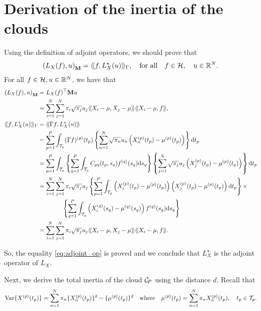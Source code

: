 \section{Derivation of the inertia of the clouds} %
\label{sec:derivation_of_the_inertia_of_the_clouds}

Using the definition of adjoint operators, we should prove that
\begin{equation}\label{eq:adjoint_op}
    \left(L_X(f), u\right)_{\mathbf{M}} = \langle\!\langle f, L^\star_X(u)\rangle\!\rangle_\Gamma, \quad\text{for all}\quad f \in \mathcal{H},\quad u \in \mathbb{R}^N.
\end{equation}
For all $f \in \mathcal{H}, u \in \mathbb{R}^N$, we have that
\begin{align*}
    \inRM{L_X(f)}{u} &= L_X(f)^\top \mathbf{M} u \\
    &= \sum_{i = 1}^N\sum_{j = 1}^N \pi_i \sqrt{\pi_j} u_j \inH{X_i - \mu}{X_j - \mu}\inH{X_i - \mu}{f}, \\
    \inHG{f}{L^\star_X(u)} &= \inH{\Gamma f}{L^\star_X(u)} \\
    &= \sum_{p = 1}^P \int_{\TT{p}} (\Gamma f)^{(p)}(t_p) \left\{ \sum_{n = 1}^N \sqrt{\pi_n} u_n \left(\Xnp(t_p) - \mup{p}(t_p)\right) \right\} \dd t_p \\
    &= \sum_{p = 1}^P \int_{\TT{p}} \left\{\sum_{q = 1}^P \int_{\TT{q}} C_{pq}(t_p, s_q)f^{(q)}(s_q) \dd s_q\right\} \left\{ \sum_{j = 1}^N \sqrt{\pi_j} u_j \left(X_j^{(p)}(t_p) - \mup{p}(t_p)\right) \right\} \dd t_p \\
    &= \sum_{i = 1}^N \sum_{j = 1}^N \pi_i \sqrt{\pi_j} u_j \left\{\sum_{p = 1}^P \int_{\TT{p}} \left(X_i^{(p)}(t_p) - \mup{p}(t_p)\right)\left(X_j^{(p)}(t_p) - \mup{p}(t_p)\right)\dd t_p\right\} \times \\
    &\qquad\qquad \left\{\sum_{q = 1}^P \int_{\TT{q}} \left(X_i^{(q)}(s_q) - \mup{q}(s_q)\right)f^{(q)}(s_q)\dd s_q\right\} \\
    &= \sum_{i = 1}^N\sum_{j = 1}^N \pi_i \sqrt{\pi_j} u_j \inH{X_i - \mu}{X_j - \mu}\inH{X_i - \mu}{f}.
\end{align*}

So, the equality \eqref{eq:adjoint_op} is proved and we conclude that $L^\star_X$ is the adjoint operator of $L_X$.

Next, we derive the total inertia of the cloud $\mathcal{C}_{\!P}$ using the distance $d$. Recall that 
\begin{equation}\label{eq:var_appendix}
    \operatorname{Var}\{X^{(p)}(t_p)\} = \sum_{n = 1}^N \pi_n \{X_n^{(p)}(t_p)\}^2 - \{\mu^{(p)}(t_p)\}^2 \quad\text{where}\quad \mu^{(p)}(t_p) = \sum_{n = 1}^N \pi_nX_n^{(p)}(t_p), \quad t_p \in \mathcal{T}_{p}.
\end{equation}


